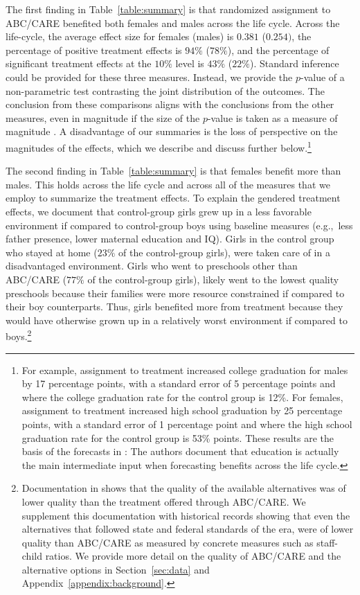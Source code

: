 The first finding in Table~\ref{table:summary} is that randomized assignment to ABC/CARE benefited both females and males across the life cycle. Across the life-cycle, the average effect size for females (males) is $0.381$ ($0.254)$, the percentage of positive treatment effects is $94\%$ ($78\%$), and the percentage of significant treatment effects at the $10\%$ level is $43\%$ ($22\%$). Standard inference could be provided for these three measures. Instead, we provide the $p$-value of a non-parametric test contrasting the joint distribution of the outcomes. The conclusion from these comparisons aligns with the conclusions from the other measures, even in magnitude if the size of the $p$-value is taken as a measure of magnitude \citep{Fisher_1935_Inference_JRSS}. A disadvantage of our summaries is the loss of perspective on the magnitudes of the effects, which we describe and discuss further below.\footnote{For example, assignment to treatment increased college graduation for males by 17 percentage points, with a standard error of 5 percentage points and where the college graduation rate for the control group is 12\%. For females, assignment to treatment increased high school graduation by 25 percentage points, with a standard error of 1 percentage point and where the high school graduation rate for the control group is 53\% points. These results are the basis of the forecasts in \citet{Garcia_Heckman_Leaf_etal_2017_Comp_CBA_Unpublished}: The authors document that education is actually the main intermediate input when forecasting benefits across the life cycle.}

The second finding in Table~\ref{table:summary} is that females benefit more than males. This holds across the life cycle and across all of the measures that we employ to summarize the treatment effects. To explain the gendered treatment effects, we document that control-group girls grew up in a less favorable environment if compared to control-group boys using baseline measures (e.g.,\ less father presence, lower maternal education and IQ). Girls in the control group who stayed at home ($23\%$ of the control-group girls), were taken care of in a disadvantaged environment. Girls who went to preschools other than ABC/CARE ($77\%$ of the control-group girls), likely went to the lowest quality preschools because their families were more resource constrained if compared to their boy counterparts. Thus, girls benefited more from treatment because they would have otherwise grown up in a relatively worst environment if compared to boys.\footnote{Documentation in \citet{Burchinal_etal_1989_CD_Daycare-Pre-K-Dev} shows that the quality of the available alternatives was of lower quality than the treatment offered through ABC/CARE. We supplement this documentation with historical records showing that even the alternatives that followed state and federal standards of the era, were of lower quality than ABC/CARE as measured by concrete measures such as staff-child ratios. We provide more detail on the quality of ABC/CARE and the alternative options in Section~\ref{sec:data} and Appendix~\ref{appendix:background}.}

